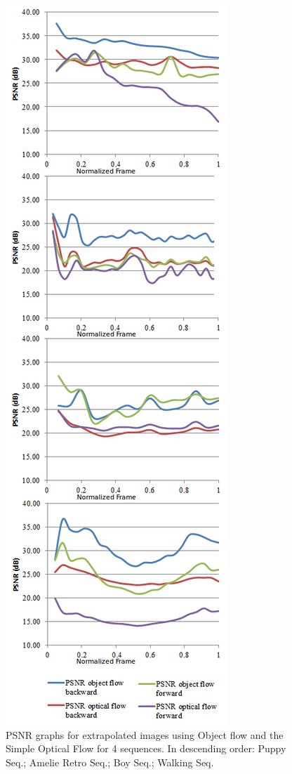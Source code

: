 {\begin{figure}[tpb]
      \includegraphics[height=1.0\textheight]{../images/psnr_v3.png}
      \caption{PSNR graphs for extrapolated images using Object flow and the Simple Optical Flow for 4 sequences. In descending order: Puppy Seq.; Amelie Retro Seq.; Boy Seq.; Walking Seq.}
      \label{of_res}
   \end{figure}
}

